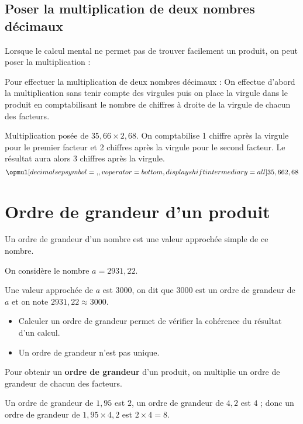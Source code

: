 \begin{pageCours}
\subsection{Poser la multiplication de deux nombres décimaux}

\begin{Mt}
Lorsque le calcul mental ne permet pas de trouver facilement un produit, on peut poser la multiplication :

Pour effectuer la multiplication de deux nombres décimaux : On effectue d'abord la multiplication sans tenir compte des virgules puis on place la virgule dans le produit en comptabilisant le nombre de chiffres à droite de la virgule de chacun des facteurs.
\end{Mt}

\begin{Ex}
Multiplication posée de $35,66\times2,68$. On comptabilise 1 chiffre après la virgule pour le premier facteur et 2 chiffres après la virgule pour le second facteur. Le résultat aura alors 3 chiffres après la virgule.
\[\opmul[decimalsepsymbol={,},
voperator=bottom,
displayshiftintermediary=all]{35,66}{2,68}\]
\end{Ex} 

\section{Ordre de grandeur d'un produit}

\begin{Def}
Un ordre de grandeur d'un nombre est une valeur approchée simple de ce nombre.
\end{Def}

\begin{Ex}
On considère le nombre $a=2931,22$.

Une valeur approchée de $a$ est $3000$, on dit que $3000$ est un ordre de grandeur de $a$ et on note $2931,22\approx3000$.
\end{Ex}

\begin{Rq}
\begin{itemize}
\item  Calculer un ordre de grandeur permet de vérifier la cohérence du résultat d'un calcul.
\item Un ordre de grandeur n'est pas unique.
\end{itemize}
\end{Rq}

\begin{Reg}
Pour obtenir un \textbf{ordre de grandeur} d'un produit, on multiplie un ordre de grandeur de chacun des facteurs.
\end{Reg} 

\begin{Ex}
Un ordre de grandeur de $1,95$ est $2$, un ordre de grandeur de $4,2$ est $4$ ; donc un ordre de grandeur de $1,95\times4,2$ est $2\times4=8$.
\end{Ex} 



\end{pageCours}



